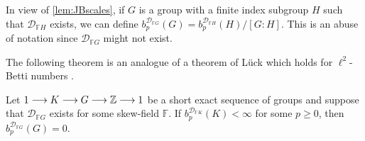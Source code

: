 \documentclass[11pt, letterpaper]{amsart}
\begin{document}
In view of \cref{lem:JBscales}, if $G$ is a group with a finite index subgroup $H$ such that $\mathcal{D}_{\mathbb{F}H}$ exists, we can define $b_p^{\mathcal{D}_{\mathbb{F}G}}(G) = b_p^{\mathcal{D}_{\mathbb{F}H}}(H)/[G:H]$. This is an abuse of notation  since $\mathcal{D}_{\mathbb{F}G}$ might not exist.

The following theorem is an analogue of a theorem of L\"uck which holds for $\ell^2$-Betti numbers \cite[Theorem 7.2]{Luck02}.


\begin{thm}\label{thm:JBSES}
Let $1 \longrightarrow K \longrightarrow G \longrightarrow \mathbb{Z} \longrightarrow 1$ be a short exact sequence of groups and suppose that $\mathcal{D}_{\mathbb{F}G}$ exists for some skew-field $\mathbb{F}$. If $b_p^{\mathcal{D}_{\mathbb{F}K}}(K) < \infty$ for some $p \geqslant 0$, then $b_p^{\mathcal{D}_{\mathbb{F}G}}(G) = 0$. 
\end{thm}
\end{document}
